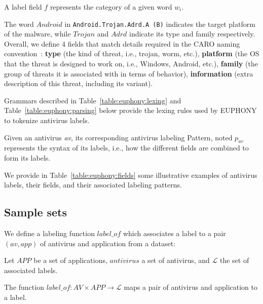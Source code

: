 \begin{definition}
	A label field $f$ represents the category of a given word $w_i$.
\end{definition}

\noindent
The word $Android$ in \texttt{Android.Trojan.Adrd.A~(B)} indicates the target platform of the malware, while $Trojan$ and $Adrd$ indicate its type and family respectively.
Overall, we define 4 fields that match details required in the CARO naming convention~\cite{skulason_caro_nodate}: \textbf{type} (the kind of threat, i.e., trojan, worm, etc.), \textbf{platform} (the OS that the threat is designed to work on, i.e., Windows, Android, etc.), \textbf{family} (the group of threats it is associated with in terms of behavior), \textbf{information} (extra description of this threat, including its variant).

Grammars described in Table~\ref{table:euphony:lexing} and Table~\ref{table:euphony:parsing} below provide the lexing rules used by EUPHONY to tokenize antivirus labels.





\begin{definition}
	Given an antivirus \emph{av}, its corresponding antivirus labeling Pattern, noted $p_{av}$ represents the syntax of its labels, i.e., how the different fields are combined to form its labels.
\end{definition}

We provide in Table~\ref{table:euphony:fields} some illustrative examples of antivirus labels, their fields, and their associated labeling patterns.


\subsection{Sample sets}
We define a labeling function $label\_of$ which associates a label to a pair $(av, app)$ of antivirus and application from a dataset:

\begin{definition}
	Let $APP$ be a set of applications, $antivirus$ a set of antivirus, and $\mathcal{L}$ the set of associated labels.

	The function $label\_of:AV \times APP \rightarrow \mathcal{L}$ maps a pair of antivirus and application to a label.
\end{definition}

